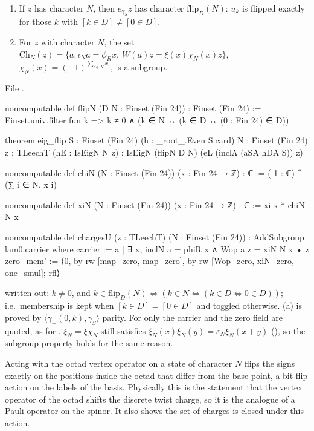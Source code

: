 \begin{proposition}\label{ch13:prop:flip}
\begin{enumerate}[label=(\alph*)]
\item If $z$ has character $N$, then $e_{\gamma_S}z$ has character $\mathrm{flip}_D(N)$: $u_k$ is flipped exactly for those
  $k$ with $[k\in D]\ne[0\in D]$.
\item For $z$ with character $N$, the set $\mathrm{Ch}_N(z)=\{a: \iota_Na=\phi_Rx,\ W(a)z=\xi(x)\chi_N(x)z\}$,
  $\chi_N(x)=(-1)^{\sum_{i\in N}x_i}$, is a subgroup.
\end{enumerate}
\end{proposition}
\noindent File .
\begin{leancode}
noncomputable def flipN (D N : Finset (Fin 24)) : Finset (Fin 24) :=
  Finset.univ.filter fun k => k ≠ 0 ∧ (k ∈ N ↔ (k ∈ D ↔ (0 : Fin 24) ∈ D))

theorem eig_flip {S : Finset (Fin 24)} (h : _root_.Even S.card) {N : Finset (Fin 24)}
    {z : TLeechT} (hE : IsEigN N z) : IsEigN (flipN D N) (eL (inclΛ (aSA hDA S)) z)

noncomputable def chiN (N : Finset (Fin 24)) (x : Fin 24 → ℤ) : ℂ := (-1 : ℂ) ^ (∑ i ∈ N, x i)

noncomputable def xiN (N : Finset (Fin 24)) (x : Fin 24 → ℤ) : ℂ := xi x * chiN N x

noncomputable def chargesU (z : TLeechT) (N : Finset (Fin 24)) : AddSubgroup lam0.carrier where
  carrier := {a | ∃ x, inclN a = phiR x ∧ Wop a z = xiN N x • z}
  zero_mem' := ⟨0, by rw [map_zero, map_zero], by rw [Wop_zero, xiN_zero, one_smul]; rfl⟩
\end{leancode}
\begin{dictionary}
 written out: $k\ne0$, and $k\in\mathrm{flip}_D(N)\iff(k\in N\iff(k\in D\iff0\in D))$; i.e.\ membership is
kept when $[k\in D]=[0\in D]$ and toggled otherwise. (a) is proved by
$\langle\gamma_-(0,k),\gamma_S\rangle$ parity. For  only the carrier and the zero field are quoted, as for
. $\xi_N=\xi\chi_N$ still satisfies $\xi_N(x)\xi_N(y)=\varepsilon_N\xi_N(x+y)$ (), so the
subgroup property holds for the same reason.
\end{dictionary}
\begin{physics}
Acting with the octad vertex operator on a state of character $N$ flips the signs exactly on the positions inside the octad that differ from the base point, a bit-flip action on the labels of the basis. Physically this is the statement that the vertex operator of the octad shifts the discrete twist charge, so it is the analogue of a Pauli operator on the spinor. It also shows the set of charges is closed under this action.
\end{physics}

